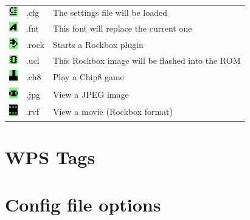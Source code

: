 \begin{center}
\begin{tabularx}{\textwidth}{llX}
\includegraphics[width=0.37cm]{appendix/images/icon-config.png} 
  & .cfg & The settings file will be loaded\\
\includegraphics[width=0.37cm]{appendix/images/icon-font.png} 
  & .fnt & This font will replace the current one\\
\includegraphics[width=0.37cm]{appendix/images/icon-rock.png} 
  & .rock & Starts a Rockbox plugin\\
\includegraphics[width=0.37cm]{appendix/images/icon-ucl.png} 
  & .ucl & This Rockbox image will be flashed into the ROM \\
\includegraphics[width=0.37cm]{appendix/images/icon-chip8.png} 
  & .ch8 & Play a Chip8 game \\
\includegraphics[width=0.37cm]{appendix/images/icon-image-file.png} 
  & .jpg & View a JPEG image \\
\includegraphics[width=0.37cm]{appendix/images/icon-movie-file.png} 
  & .rvf & View a movie (Rockbox format)\\\bottomrule
\end{tabularx}
\end{center}

\chapter{\label{ref:wps_tags}WPS Tags}


\chapter{\label{ref:config_file_options}Config file options}


